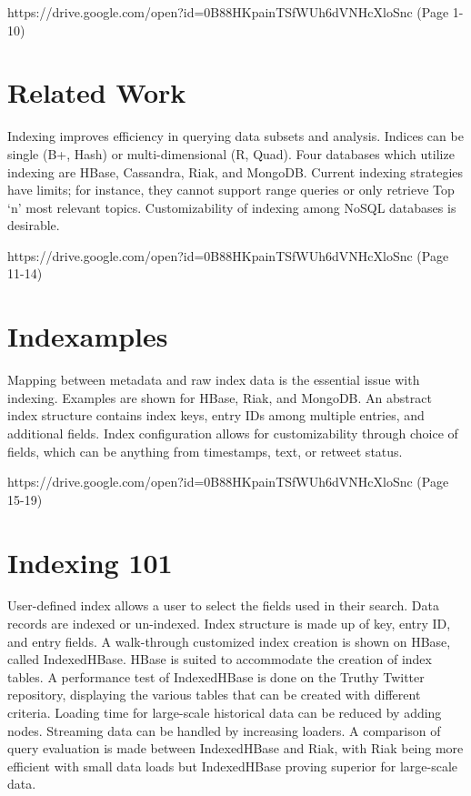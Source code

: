 {https://drive.google.com/open?id=0B88HKpainTSfWUh6dVNHcXloSnc
  (Page 1-10)}

\section{Related Work}

Indexing improves efficiency in querying data subsets and analysis.
Indices can be single (B+, Hash) or multi-dimensional (R, Quad). Four
databases which utilize indexing are HBase, Cassandra, Riak, and
MongoDB. Current indexing strategies have limits; for instance, they
cannot support range queries or only retrieve Top `n' most relevant
topics. Customizability of indexing among NoSQL databases is desirable.


{https://drive.google.com/open?id=0B88HKpainTSfWUh6dVNHcXloSnc
  (Page 11-14)}

\section{Indexamples}

Mapping between metadata and raw index data is the essential issue with
indexing. Examples are shown for HBase, Riak, and MongoDB. An abstract
index structure contains index keys, entry IDs among multiple entries,
and additional fields. Index configuration allows for customizability
through choice of fields, which can be anything from timestamps, text,
or retweet status.


{https://drive.google.com/open?id=0B88HKpainTSfWUh6dVNHcXloSnc
  (Page 15-19)}

\section{Indexing 101}

User-defined index allows a user to select the fields used in their
search. Data records are indexed or un-indexed. Index structure is made
up of key, entry ID, and entry fields. A walk-through customized index
creation is shown on HBase, called IndexedHBase. HBase is suited to
accommodate the creation of index tables. A performance test of
IndexedHBase is done on the Truthy Twitter repository, displaying the
various tables that can be created with different criteria. Loading time
for large-scale historical data can be reduced by adding nodes.
Streaming data can be handled by increasing loaders. A comparison of
query evaluation is made between IndexedHBase and Riak, with Riak being
more efficient with small data loads but IndexedHBase proving superior
for large-scale data.

